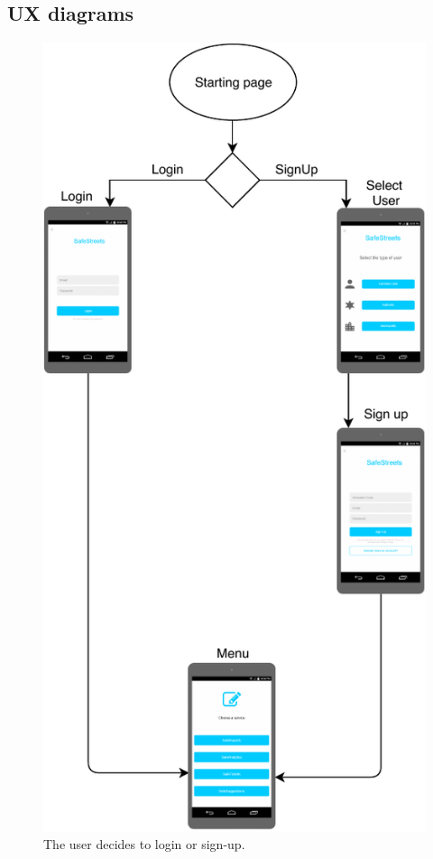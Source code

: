 \documentclass[./main.tex]{subfiles}
\begin{document}
\clearpage

\subsection{UX diagrams}

\begin{figure}[H]
\centering
\includegraphics[]{resources/UXflow/lux}
\caption{ The user decides to login or sign-up. }
\end{figure}
\end{document}
